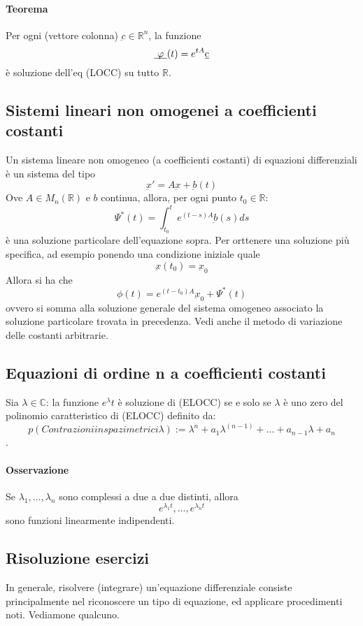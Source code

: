 \documentclass[a4paper,12pt]{article}
\begin{document}
\paragraph{Teorema} Per ogni (vettore colonna) $\underbar{c} \in \mathbb{R}^n $, la funzione $$ \underbar{ $\varphi$ }(t) = e^{tA} \underbar{c} $$è soluzione dell'eq (LOCC) su tutto $\mathbb{R}$.

\subsection{Sistemi lineari non omogenei a coefficienti costanti}
Un sistema lineare non omogeneo (a coefficienti costanti) di equazioni differenziali è un sistema del tipo
$$\underbar{x}'=A\underbar{x}+\underbar{b}(t)$$
Ove $A\in M_n(\mathbb{R})$ e $b$ continua, allora, per ogni punto $t_0 \in \mathbb{R}$:
$$\Psi^*(t)= \int_{t_0}^t e^{(t-s)A} \underbar{b}(s)ds$$
è una soluzione particolare dell'equazione sopra.
Per orttenere una soluzione più specifica, ad esempio ponendo una condizione iniziale quale
$$\underbar{x}(t_0)=\underbar{x}_0$$
Allora si ha che
$$\phi(t)=e^{(t-t_0)A}\underbar{x}_0+\Psi^*(t)$$
ovvero si somma alla soluzione generale del sistema omogeneo associato la soluzione particolare trovata in precedenza.
Vedi anche il metodo di variazione delle costanti arbitrarie.

\subsection{Equazioni di ordine n a coefficienti costanti}
Sia $\lambda \in \mathbb{C}$: la funzione $e^\lambda t$ è soluzione di (ELOCC) se e solo se $\lambda$ è uno zero del polinomio caratteristico di (ELOCC) definito da: $$ p({Contrazioni in spazi metrici}\lambda) := \lambda^n + a_1\lambda^{(n-1)}+ \dots +a_{n-1}\lambda+a_n$$. 
\paragraph*{Osservazione}
Se  $\lambda_1,\dots,\lambda_n$ sono complessi a due a due distinti, allora 
$$ e^{\lambda_1 t}, \dots ,e^{\lambda_n t}$$ sono funzioni linearmente indipendenti. 



\subsection{Risoluzione esercizi}
In generale, risolvere (integrare) un'equazione differenziale consiste principalmente nel riconoscere un tipo di equazione, ed applicare procedimenti noti. Vediamone qualcuno.
\end{document}
